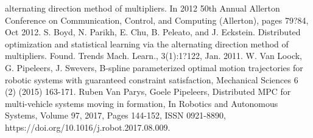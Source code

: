 \documentclass[letterpaper, 10 pt, conference]{ieeeconf}
\begin{document}
\begin{thebibliography}{99}
alternating direction method of multipliers. In 2012 50th Annual Allerton Conference
on Communication, Control, and Computing (Allerton), pages 79?84, Oct 2012.
 S. Boyd, N. Parikh, E. Chu, B. Peleato, and J. Eckstein. Distributed optimization and
statistical learning via the alternating direction method of multipliers. Found. Trends
Mach. Learn., 3(1):1?122, Jan. 2011.
 W. Van Loock, G. Pipeleers, J. Swevers, B-spline parameterized
optimal motion trajectories for robotic systems with guaranteed constraint satisfaction, Mechanical Sciences 6 (2) (2015) 163-171.
 Ruben Van Parys, Goele Pipeleers, Distributed MPC for multi-vehicle systems moving in formation, In Robotics and Autonomous Systems, Volume 97, 2017, Pages 144-152, ISSN 0921-8890, https://doi.org/10.1016/j.robot.2017.08.009.
\end{thebibliography}%
\end{document}
